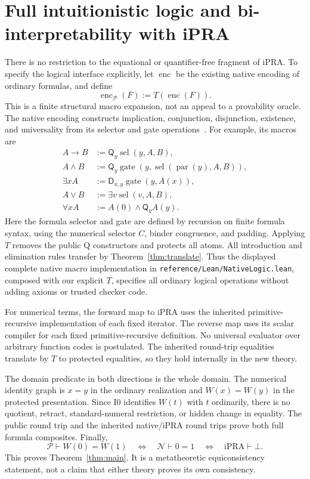 \documentclass[11pt,letterpaper]{article}
\theoremstyle{definition}\newtheorem{definition}[theorem]{Definition}
\theoremstyle{remark}\newtheorem{remark}[theorem]{Remark}
\newcommand{\D}{\mathsf D}\newcommand{\Q}{\mathsf Q}
\newcommand{\Ncal}{\mathcal N}\newcommand{\Pcal}{\mathcal P}
\newcommand{\ipra}{\mathrm{iPRA}}
\newcommand{\file}[1]{{\urlstyle{tt}\nolinkurl{#1}}}
\begin{document}
\section{Full intuitionistic logic and bi-interpretability with iPRA}

There is no restriction to the equational or quantifier-free fragment
of iPRA. To specify the logical interface explicitly, let
\(\operatorname{enc}\) be the existing native encoding of ordinary
formulas, and define
\[
             \operatorname{enc}_{\Pcal}(F):=T(\operatorname{enc}(F)).
\]
This is a finite structural macro expansion, not an appeal to a
provability oracle. The native encoding constructs implication,
conjunction, disjunction, existence, and universality from its selector
and gate operations~\cite{native}. For example, its macros are
\begin{align*}
 A\to B&:=\Q_y\operatorname{sel}(y,A,B),\\
 A\wedge B&:=\Q_y\operatorname{gate}
       (y,\operatorname{sel}(\operatorname{par}(y),A,B)),\\
 \exists xA&:=\D_{x,y}\operatorname{gate}(y,A(x)),\\
 A\vee B&:=\exists v\operatorname{sel}(v,A,B),\\
 \forall xA&:=A(0)\wedge\Q_yA(y).
\end{align*}
Here the formula selector and gate are defined by recursion on finite
formula syntax, using the numerical selector \(C\), binder congruence,
and padding. Applying \(T\) removes the public Q constructors and
protects all atoms. All introduction and elimination rules transfer by
Theorem~\ref{thm:translate}. Thus the displayed complete native
macro implementation in \file{reference/Lean/NativeLogic.lean},
composed with our explicit \(T\), specifies all ordinary logical
operations without adding axioms or trusted checker code.

For numerical terms, the forward map to iPRA uses the inherited
primitive-recursive implementation of each fixed iterator. The reverse
map uses its scalar compiler for each fixed primitive-recursive
definition. No universal evaluator over arbitrary function codes is
postulated. The inherited round-trip equalities translate by \(T\)
to protected equalities, so they hold internally in the new theory.

The domain predicate in both directions is the whole domain. The
numerical identity graph is \(x=y\) in the ordinary realization and
\(W(x)=W(y)\) in the protected presentation. Since I0 identifies
\(W(t)\) with \(t\) ordinarily, there is no quotient, retract,
standard-numeral restriction, or hidden change in equality.
The public round trip and the inherited native/iPRA round trips prove
both full formula composites. Finally,
\[
 \Pcal\vdash W(0)=W(1)
 \quad\Longleftrightarrow\quad
 \Ncal\vdash0=1
 \quad\Longleftrightarrow\quad
 \ipra\vdash\bot.
\]
This proves Theorem~\ref{thm:main}. It is a metatheoretic
equiconsistency statement, not a claim that either theory proves its
own consistency.
\end{document}
